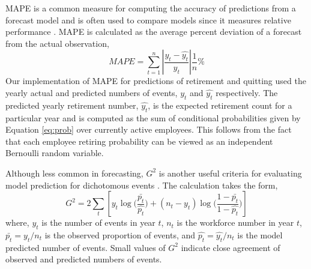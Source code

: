 \documentclass[12pt,letterpaper]{article}
\begin{document}
MAPE is a common measure for computing the accuracy of predictions from a forecast model and is often used to compare models since it measures relative performance \citep{chu1998}. MAPE is calculated as the average percent deviation of a forecast from the actual observation,
\begin{equation}
\label{eq:mape}
MAPE=\sum_{t=1}^{n}\left | \frac{y_t-\hat{y_t}}{y_t} \right |\frac{1}{n}\%
\end{equation}
Our implementation of MAPE for predictions of retirement and quitting used the yearly actual and predicted numbers of events, $y_t$ and $\hat{y_t}$ respectively. The predicted yearly retirement number, $\hat{y_t}$,  is the expected retirement count for a particular year and is computed as the sum of conditional probabilities given by Equation \ref{eq:prob} over currently active employees. This follows from the fact that each employee retiring probability can be viewed as an independent Bernoulli random variable.



Although less common in forecasting, $G^2$ is another useful criteria for evaluating model prediction for dichotomous events \citep{Simonoff2013}. The calculation takes the form,
\begin{equation}
\label{eq:g2}
G^2=2\sum_{t}[y_t\log{(\frac{\bar{p_t}}{\hat{p_t}}})+ (n_t-y_t)\log{(\frac{1-\bar{p_t}}{1-\hat{p_t}}})]
\end{equation}
where, $y_t$ is the number of events in year $t$, $n_t$ is the workforce number in year $t$, $\bar{p_t}={y_t}/{n_t}$ is the observed proportion of events, and $\hat{p_t}={\hat{y_t}}/{n_t} $ is the model predicted number of events.  Small values of $G^2$ indicate close agreement of observed and predicted numbers of events.



\end{document}
